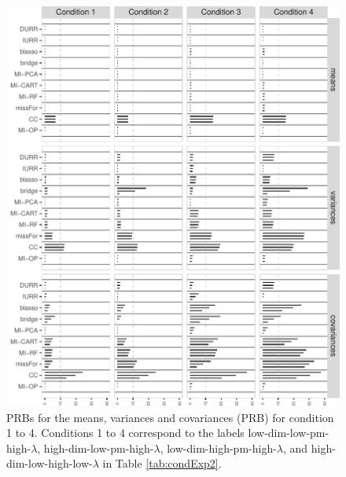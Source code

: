 \begin{figure}
	\includegraphics{../../output/graphs/exp2_semR_bias_14_summy.pdf}
\caption{PRBs for the means, variances and covariances (PRB) for condition 1 to 4.
	Conditions 1 to 4 correspond to the labels low-dim-low-pm-high-$\lambda$, high-dim-low-pm-high-$\lambda$, 
	low-dim-high-pm-high-$\lambda$, and high-dim-low-high-low-$\lambda$ in Table \ref{tab:condExp2}.
}
\label{fig:exp2bias14}
\end{figure}

